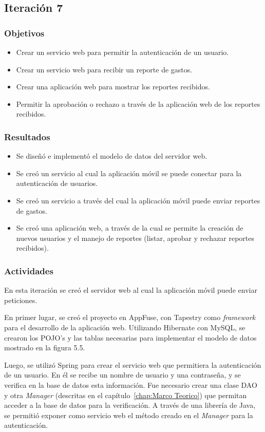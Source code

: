 \subsection{Iteración 7}
\subsubsection{Objetivos}
\begin{itemize}
\item Crear un servicio web para permitir la autenticación de un usuario.
\item Crear un servicio web para recibir un reporte de gastos.
\item Crear una aplicación web para mostrar los reportes recibidos.
\item Permitir la aprobación o rechazo a través de la aplicación web de los reportes recibidos.
\end{itemize}
\subsubsection{Resultados}
\begin{itemize}
\item Se diseñó e implementó el modelo de datos del servidor web.
\item Se creó un servicio al cual la aplicación móvil se puede conectar para la autenticación de usuarios.
\item Se creó un servicio a través del cual la aplicación móvil puede enviar reportes de gastos.
\item Se creó una aplicación web, a través de la cual se permite la creación de nuevos usuarios y el manejo de reportes (listar, aprobar y rechazar reportes recibidos).
\end{itemize}

\subsubsection{Actividades}

En esta iteración se creó el servidor web al cual la aplicación móvil puede enviar peticiones.

En primer lugar, se creó el proyecto en AppFuse, con Tapestry como \textit{framework} para el desarrollo de la aplicación web. Utilizando Hibernate con MySQL, se crearon los POJO's y las tablas necesarias para implementar el modelo de datos mostrado en la figura 5.5.

Luego, se utilizó Spring para crear el servicio web que permitiera la autenticación de un usuario. En él se recibe un nombre de usuario y una contraseña, y se verifica en la base de datos esta información. Fue necesario crear una clase DAO y otra \textit{Manager} (descritas en el capítulo~\ref{chap:Marco Teorico}) que permitan acceder a la base de datos para la verificación. A través de una librería de Java, se permitió exponer como servicio web el método creado en el \textit{Manager} para la autenticación.

